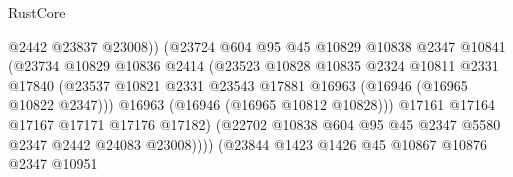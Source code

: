 \begin{lexlean}{RustCore}
\begin{coremodule}
                                        @2442
                                        @23837
                                        @23008))
                                    (@23724
                                      @604
                                      @95
                                      @45
                                      @10829
                                      @10838
                                      @2347
                                      @10841
                                      (@23734
                                        @10829
                                        @10836
                                        @2414
                                        (@23523
                                          @10828
                                          @10835
                                          @2324
                                          @10811
                                          @2331
                                          @17840
                                          (@23537
                                            @10821
                                            @2331
                                            @23543
                                            @17881
                                            @16963
                                            (@16946 (@16965 @10822 @2347)))
                                          @16963
                                          (@16946 (@16965 @10812 @10828)))
                                        @17161
                                        @17164
                                        @17167
                                        @17171
                                        @17176
                                        @17182)
                                      (@22702
                                        @10838
                                        @604
                                        @95
                                        @45
                                        @2347
                                        @5580
                                        @2347
                                        @2442
                                        @24083
                                        @23008))))
                                (@23844
                                  @1423
                                  @1426
                                  @45
                                  @10867
                                  @10876
                                  @2347
                                  @10951

\end{coremodule}
\end{lexlean}
